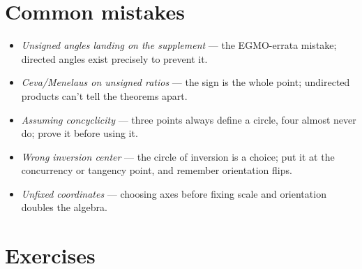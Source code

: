 \section{Common mistakes}
\begin{itemize}
\item \emph{Unsigned angles landing on the supplement} --- the
EGMO-errata mistake; directed angles exist precisely to prevent it.
\item \emph{Ceva/Menelaus on unsigned ratios} --- the sign is the whole
point; undirected products can't tell the theorems apart.
\item \emph{Assuming concyclicity} --- three points always define a
circle, four almost never do; prove it before using it.
\item \emph{Wrong inversion center} --- the circle of inversion is a
choice; put it at the concurrency or tangency point, and remember
orientation flips.
\item \emph{Unfixed coordinates} --- choosing axes before fixing scale
and orientation doubles the algebra.
\end{itemize}

\section*{Exercises}
